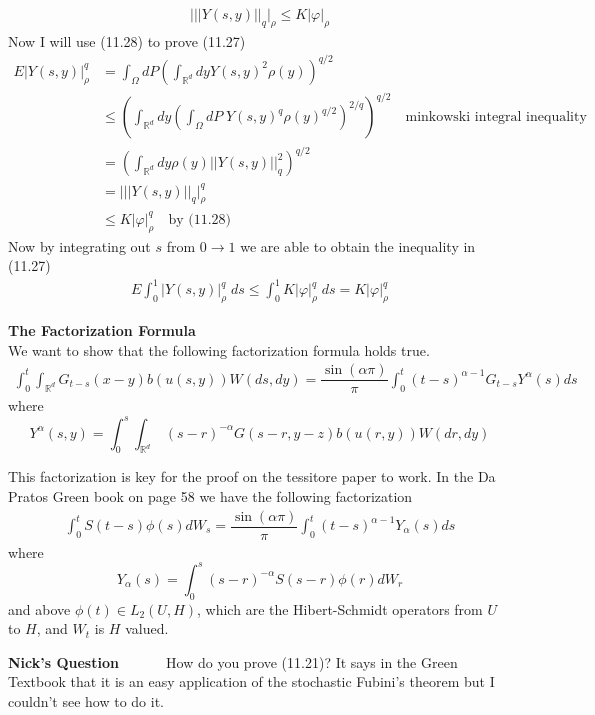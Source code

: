 \documentclass[a4paper,11pt]{article}
\theoremstyle{plain}
\theoremstyle{definition}
\newcommand{\R}{\mathbb{R}}
\newcounter{NQ}
\newenvironment{NickQuestion}[1][] %
  {\refstepcounter{NQ}
  \begin{mdframed}[backgroundcolor=lightgray]\textbf{Nick's Question \theNQ \: #1~~}~~~\noindent}%
  {\end{mdframed}}
\numberwithin{NQ}{section}
\numberwithin{LQ}{section}
\numberwithin{ZQ}{section}
\begin{document}
\begin{align}
    \bigg|||Y(s,y)||_q\bigg|_\rho \le K |\varphi|_\rho
\end{align}
Now I will use (11.28) to prove (11.27)
\begin{align*}
    E |Y(s,y)|_{\rho}^q &= \int_\Omega dP \left(\int_{\R^d} dy Y(s,y)^2\rho(y) \right)^{q/2} 
    \\ &\le \left(\int_{\R^d}dy \left( \int_\Omega dP \; Y(s,y)^q \rho(y)^{q/2} \right)^{2/q}\right)^{q/2} \quad \text{minkowski integral inequality}
    \\ &= \left(\int_{\R^d}dy \rho(y) || Y(s,y) ||_q^2 \right)^{q/2}
    \\ &= \bigg|||Y(s,y)||_q\bigg|_\rho^q
    \\ & \le K |\varphi|_\rho^q \quad \text{by (11.28)}
\end{align*}
Now by integrating out $s$ from $0\to1$ we are able to obtain the inequality in (11.27)
\begin{align}
    E\int_0^1  |Y(s,y)|_{\rho}^q\;ds \le \int_0^1 K |\varphi|_\rho^q \;ds = K |\varphi|_\rho^q
\end{align}
\qedsymbol{}
\vspace{.2in}

 \noindent\textbf{The Factorization Formula} \\
We want to show that the following factorization formula holds true.  
\begin{align} \int_0^t\int_{\mathbb R^d}G_{t-s}(x-y)b(u(s,y))W(ds,dy)=\dfrac{\sin(\alpha \pi)}{\pi}\int_0^t(t-s)^{\alpha-1}G_{t-s}Y^\alpha(s)ds \end{align}
where $$Y^\alpha(s,y)=\int_0^s \int_{\R^d} \: (s-r)^{-\alpha}G(s-r,y-z)b(u(r,y))W(dr,dy)$$

This factorization is key for the proof on the tessitore paper to work. In the Da Pratos Green book on page 58 we have the following factorization 
\begin{align} \int_0^t S(t-s)\phi(s) dW_s = \dfrac{\sin(\alpha \pi)}{\pi}\int_0^t(t-s)^{\alpha-1}Y_\alpha(s)ds \end{align} 
where
$$Y_\alpha (s)=\int_0^s(s-r)^{-\alpha}S(s-r)\phi(r)dW_r $$
and above $\phi(t)\in L_2(U,H)$, which are the Hibert-Schmidt operators from $U$ to $H$, and $W_t$ is $H$ valued. 

\begin{NickQuestion}
How do you prove (11.21)? It says in the Green Textbook that it is an easy application of the stochastic Fubini's theorem but I couldn't see how to do it. 
\end{NickQuestion}
\end{document}
